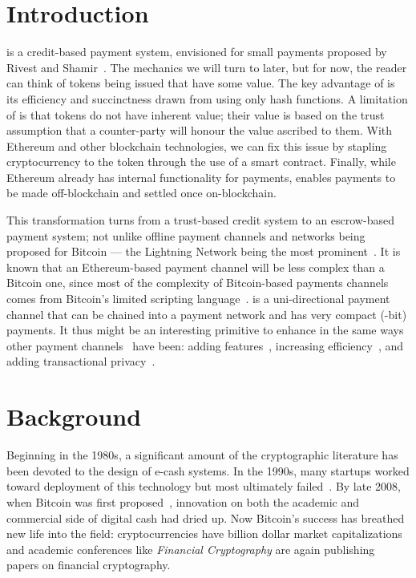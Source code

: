 

\section{Introduction} 

\pw is a credit-based payment system, envisioned for small payments proposed by Rivest and Shamir~\cite{RS96}. The mechanics we will turn to later, but for now, the reader can think of tokens being issued that have some value. The key advantage of \pw is its efficiency and succinctness drawn from using only hash functions. A limitation of \pw is that tokens do not have inherent value; their value is based on the trust assumption that a counter-party will honour the value ascribed to them. With Ethereum and other blockchain technologies, we can fix this issue by stapling cryptocurrency to the token through the use of a smart contract. Finally, while Ethereum already has internal functionality for payments, \ew enables payments to be made off-blockchain and settled once on-blockchain.

This transformation turns \pw from a trust-based credit system to an escrow-based payment system; not unlike offline payment channels and networks being proposed for Bitcoin --- the Lightning Network being the most prominent~\cite{PD15}. It is known that an Ethereum-based payment channel will be less complex than a Bitcoin one, since most of the complexity of Bitcoin-based payments channels comes from Bitcoin's limited scripting language~\cite{MMSH16}. \ew is a uni-directional payment channel that can be chained into a payment network and has very compact (-bit) payments. It thus might be an interesting primitive to enhance in the same ways other payment channels~\cite{DW15,PD15} have been: adding features~\cite{KG17}, increasing efficiency~\cite{DEFM17,MBKM17}, and adding transactional privacy~\cite{GM17,MMK+17,HAB+17,RMKG18}.

\section{Background}

Beginning in the 1980s, a significant amount of the cryptographic literature has been devoted to the design of e-cash systems. In the 1990s, many startups worked toward deployment of this technology but most ultimately failed~\cite{NBFMG16}. By late 2008, when Bitcoin was first proposed~\cite{Nak08}, innovation on both the academic and commercial side of digital cash had dried up. Now Bitcoin's success has breathed new life into the field: cryptocurrencies have billion dollar market capitalizations and academic conferences like \textit{Financial Cryptography} are again publishing papers on financial cryptography. 

